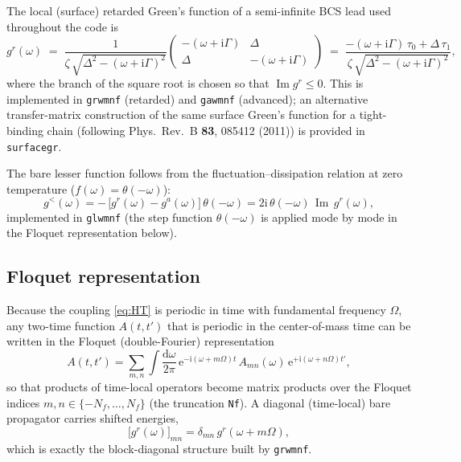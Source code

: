 \documentclass[11pt,a4paper]{article}
\newcommand{\dd}{\mathrm{d}}
\newcommand{\ii}{\mathrm{i}}
\newcommand{\ee}{\mathrm{e}}
\newcommand{\Imag}{\operatorname{Im}}
\newcommand{\Om}{\Omega}
\begin{document}
The local (surface) retarded Green's function of a semi-infinite BCS lead used
throughout the code is
\begin{equation}
  g^r(\omega) \;=\;
  \frac{1}{\zeta\,\sqrt{\Delta^2-(\omega+\ii\Gamma)^2}}
  \begin{pmatrix}
    -(\omega+\ii\Gamma) & \Delta\\[2pt]
    \Delta & -(\omega+\ii\Gamma)
  \end{pmatrix}
  \;=\;
  \frac{-(\omega+\ii\Gamma)\,\tau_0+\Delta\,\tau_1}
       {\zeta\,\sqrt{\Delta^2-(\omega+\ii\Gamma)^2}} ,
  \label{eq:surface_gf}
\end{equation}
where the branch of the square root is chosen so that $\Imag g^r\le 0$.  This is
implemented in \texttt{grwmnf} (retarded) and \texttt{gawmnf} (advanced); an
alternative transfer-matrix construction of the same surface Green's function
for a tight-binding chain (following Phys.\ Rev.\ B \textbf{83}, 085412 (2011))
is provided in \texttt{surfacegr}.

The bare lesser function follows from the fluctuation--dissipation relation at
zero temperature ($f(\omega)=\theta(-\omega)$):
\begin{equation}
  g^<(\omega) = -\,\bigl[g^r(\omega)-g^a(\omega)\bigr]\,\theta(-\omega)
              = 2\ii\,\theta(-\omega)\,\Imag\, g^r(\omega) ,
  \label{eq:bare_lesser}
\end{equation}
implemented in \texttt{glwmnf} (the step function $\theta(-\omega)$ is applied
mode by mode in the Floquet representation below).

\subsection{Floquet representation}
\label{sec:floquet}

Because the coupling \eqref{eq:HT} is periodic in time with fundamental
frequency $\Om$, any two-time function $A(t,t')$ that is periodic in the
center-of-mass time can be written in the Floquet (double-Fourier)
representation
\begin{equation}
  A(t,t') = \sum_{m,n}\int\frac{\dd\omega}{2\pi}\,
            \ee^{-\ii(\omega+m\Om)t}\,A_{mn}(\omega)\,\ee^{+\ii(\omega+n\Om)t'},
\end{equation}
so that products of time-local operators become matrix products over the
Floquet indices $m,n\in\{-N_f,\dots,N_f\}$ (the truncation \texttt{Nf}).  A
diagonal (time-local) bare propagator carries shifted energies,
\begin{equation}
  \bigl[g^r(\omega)\bigr]_{mn} = \delta_{mn}\,g^r(\omega+m\Om),
  \label{eq:floquet_bare}
\end{equation}
which is exactly the block-diagonal structure built by \texttt{grwmnf}.
\end{document}
